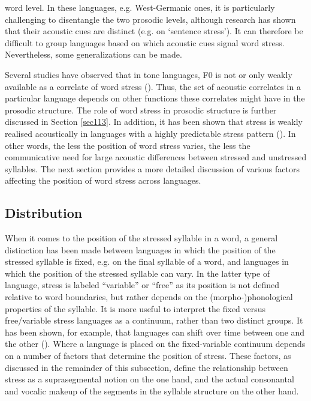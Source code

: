 word level. In these languages, e.g. West-Germanic ones, it is particularly challenging to disentangle the two prosodic levels, although research has shown that their acoustic cues are distinct (e.g. \citealt{vanheuven_acoustic_2018} on `sentence stress'). It can therefore be difficult to group languages based on which acoustic cues signal word stress. Nevertheless, some generalizations can be made.

Several studies have observed that in tone languages, F0 is not or only weakly available as a correlate of word stress (\citealt{gordon_acoustic_2017}). Thus, the set of acoustic correlates in a particular language depends on other functions these correlates might have in the prosodic structure. The role of word stress in prosodic structure is further discussed in Section \ref{sec113}. In addition, it has been shown that stress is weakly realised acoustically in languages with a highly predictable stress pattern (\citealt{dogil_phonetic_1999}). In other words, the less the position of word stress varies, the less the communicative need for large acoustic differences between stressed and unstressed syllables. The next section provides a more detailed discussion of various factors affecting the position of word stress across languages.

\subsection{Distribution} \label{sec112}
When it comes to the position of the stressed syllable in a word, a general distinction has been made between languages in which the position of the stressed syllable is fixed, e.g. on the final syllable of a word, and languages in which the position of the stressed syllable can vary. In the latter type of language, stress is labeled ``variable'' or ``free'' as its position is not defined relative to word boundaries, but rather depends on the (morpho-)phonological properties of the syllable. It is more useful to interpret the fixed versus free/variable stress languages as a continuum, rather than two distinct groups. It has been shown, for example, that languages can shift over time between one and the other (\citealt{baerman_evolution_1999}). Where a language is placed on the fixed-variable continuum depends on a number of factors that determine the position of stress. These factors, as discussed in the remainder of this subsection, define the relationship between stress as a suprasegmental notion on the one hand, and the actual consonantal and vocalic makeup of the segments in the syllable structure on the other hand.

